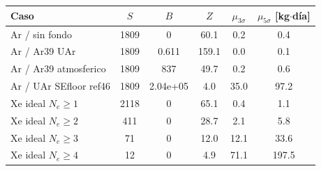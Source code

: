 \begin{tabular}{@{}lccccc@{}}
\toprule
Caso & $S$ & $B$ & $Z$ & $\mu_{3\sigma}$ & $\mu_{5\sigma}$ [kg$\cdot$día] \\
\midrule
Ar / sin fondo & 1809 & 0 & 60.1 & 0.2 & 0.4 \\
Ar / Ar39 UAr & 1809 & 0.611 & 159.1 & 0.0 & 0.1 \\
Ar / Ar39 atmosferico & 1809 & 837 & 49.7 & 0.2 & 0.6 \\
Ar / UAr SEfloor ref46 & 1809 & 2.04e+05 & 4.0 & 35.0 & 97.2 \\
Xe ideal $N_e\geq1$ & 2118 & 0 & 65.1 & 0.4 & 1.1 \\
Xe ideal $N_e\geq2$ & 411 & 0 & 28.7 & 2.1 & 5.8 \\
Xe ideal $N_e\geq3$ & 71 & 0 & 12.0 & 12.1 & 33.6 \\
Xe ideal $N_e\geq4$ & 12 & 0 & 4.9 & 71.1 & 197.5 \\
\bottomrule
\end{tabular}
